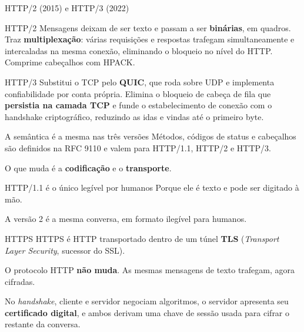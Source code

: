 \documentclass{beamer}
\begin{document}
\begin{frame}{HTTP/2 (2015) e HTTP/3 (2022)}
  \begin{block}{HTTP/2}
    Mensagens deixam de ser texto e passam a ser \textbf{binárias}, em quadros.
    Traz \textbf{multiplexação}: várias requisições e respostas trafegam
    simultaneamente e intercaladas na mesma conexão, eliminando o bloqueio no
    nível do HTTP. Comprime cabeçalhos com HPACK.
  \end{block}

  \begin{block}{HTTP/3}
    Substitui o TCP pelo \textbf{QUIC}, que roda sobre UDP e implementa
    confiabilidade por conta própria. Elimina o bloqueio de cabeça de fila que
    \textbf{persistia na camada TCP} e funde o estabelecimento de conexão com o
    handshake criptográfico, reduzindo as idas e vindas até o primeiro byte.
  \end{block}
\end{frame}

\begin{frame}{A semântica é a mesma nas três versões}
  Métodos, códigos de status e cabeçalhos são definidos na RFC 9110 e valem para
  HTTP/1.1, HTTP/2 e HTTP/3.

  \vspace{0.4cm}
  O que muda é a \textbf{codificação} e o \textbf{transporte}.

  \vspace{0.6cm}
  \begin{block}{HTTP/1.1 é o único legível por humanos}
    Porque ele é texto e pode ser digitado à mão.

    \vspace{0.2cm}
    A versão 2 é a mesma conversa, em formato ilegível para humanos.
  \end{block}
\end{frame}


\begin{frame}{HTTPS}
  HTTPS é HTTP transportado dentro de um túnel \textbf{TLS}
  (\textit{Transport Layer Security}, sucessor do SSL).

  \vspace{0.4cm}
  O protocolo HTTP \textbf{não muda}. As mesmas mensagens de texto trafegam,
  agora cifradas.

  \vspace{0.5cm}
  No \textit{handshake}, cliente e servidor negociam algoritmos, o servidor
  apresenta seu \textbf{certificado digital}, e ambos derivam uma chave de
  sessão usada para cifrar o restante da conversa.
\end{frame}
\end{document}
